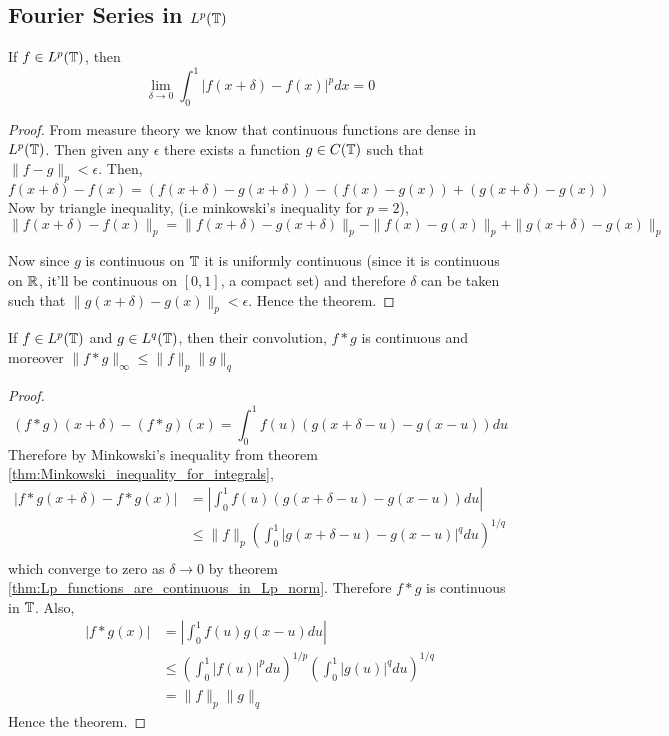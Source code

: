 \subsection{Fourier Series in $L^p(\mathbb T)$}
\begin{theorem}
  \label{thm:Lp_functions_are_continuous_in_Lp_norm}
  If $f \in L^p(\mathbb T)$, then
  \begin{displaymath}
   \lim_{\delta \to 0} \int_0^1 |f(x+\delta) - f(x)|^p dx = 0
  \end{displaymath}
\end{theorem}
\begin{proof}
  From measure theory we know that continuous functions are dense in $L^p(\mathbb T)$. Then given any $\epsilon$ there exists a function $g\in C(\mathbb T)$ such that $\|f-g\|_p < \epsilon$. Then,
  $$ f(x+\delta) - f(x) = (f(x+\delta) - g(x+\delta)) - (f(x) - g(x)) + ( g(x+\delta) - g(x))$$
  Now by triangle inequality, (i.e minkowski's inequality for $p = 2$), 
  $$ \|f(x+\delta) - f(x)\|_p = \|f(x+\delta) - g(x+\delta)\|_p - \|f(x) - g(x)\|_p + \|g(x+\delta) - g(x)\|_p$$

  Now since $g$ is continuous on $\mathbb T$ it is uniformly continuous (since it is continuous on $\mathbb R$, it'll be continuous on $[0,1]$, a compact set) and therefore $\delta$ can be taken such that $\|g(x+\delta) - g(x) \|_p < \epsilon$. Hence the theorem.
\end{proof}

\begin{theorem}
  \label{thm:convolution_of_Lp_functions}
  If $f \in L^p(\mathbb T)$ and $g \in L^q(\mathbb T)$, then their convolution, $f*g$ is continuous and moreover $\|f*g\|_{\infty} \le \|f\|_p \|g\|_q$
\end{theorem}
\begin{proof}
  $$(f*g)(x+\delta) - (f*g)(x) = \int_0^1 f(u)(g(x+\delta - u) - g(x-u)) du $$
  Therefore by Minkowski's inequality from theorem \ref{thm:Minkowski_inequality_for_integrals}, 
  \begin{align*}
    |f*g(x+\delta) - f*g(x)| &= \left| \int_0^1 f(u) (g(x + \delta -u)- g(x-u)) du \right| \\
          &\le \|f\|_p \left( \int_0^1|g(x+\delta - u) - g(x-u)|^q du \right)^{1/q} \\
  \end{align*}
  which converge to zero as $\delta \to 0$ by theorem \ref{thm:Lp_functions_are_continuous_in_Lp_norm}. Therefore $f*g$ is continuous in $\mathbb T$.
  Also, 
  \begin{align*}
    |f*g(x)| &= \left| \int_0^1 f(u)g(x-u) du \right| \\
            &\le \left(\int_0^1 |f(u)|^p du \right)^{1/p} \left(\int_0^1 |g(u)|^q du \right)^{1/q} \\
            &= \|f\|_p \|g\|_q
  \end{align*}
  Hence the theorem.
\end{proof}


